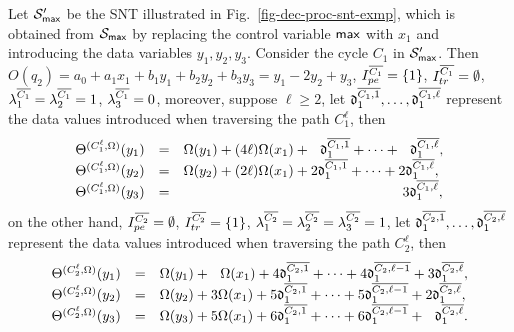 \begin{example}\label{exmp-sum}
Let ${\mathcal{S} }'_{\sf max}$ be the SNT illustrated in Fig.~\ref{fig-dec-proc-snt-exmp}, which is obtained from ${\mathcal{S} }_{\sf max}$ by replacing  the control variable $\sf max$ with  $x_1$ and introducing the data variables $y_1,y_2, y_3$. Consider the cycle $C_1$ in ${\mathcal{S} }'_{\sf max}$. Then $O(q_2)= a_0 + a_1 x_1 + b_1 y_1 + b_2 y_2 + b_3 y_3 = y_1 - 2y_2 + y_3$, $I^{\overline{C_1}}_{pe} = \{1\}$, $I^{\overline{C_1}}_{tr} = \emptyset$, $\lambda^{\overline{C_1}}_1 = \lambda^{\overline{C_1}}_2 = 1$, $\lambda^{\overline{C_1}}_3 = 0$, moreover, suppose $\ell \ge 2$, let $ \mathfrak{d}^{\overline{C_1, 1}}_1, \dots, \mathfrak{d}^{\overline{C_1, \ell}}_1$ represent the data values introduced when traversing the path $C^\ell_1$, then
\[
\begin{array}{l c l}
\sumf^{(C^\ell_1, \initval)}(y_1) &= & \initval(y_1) + (4 \ell) \initval(x_1) +\ \ \vard^{\circled{C_1, 1}}_1 + \dots +\ \ \vard^{\circled{C_1, \ell}}_1,\\
%
\sumf^{(C^\ell_1, \initval)}(y_2) &=& \initval(y_2) + (2 \ell) \initval(x_1) + 2 \vard^{\circled{C_1, 1}}_1 + \dots + 2 \vard^{\circled{C_1, \ell}}_1,\\
%
\sumf^{(C^\ell_1, \initval)}(y_3) &=& \hspace{5.5cm} 3 \vard^{\circled{C_1, \ell}}_1,
\end{array}
\] 
on the other hand, $I^{\overline{C_2}}_{pe} = \emptyset$, $I^{\overline{C_2}}_{tr} = \{1\}$, $\lambda^{\overline{C_2}}_1 = \lambda^{\overline{C_2}}_2 = \lambda^{\overline{C_2}}_3  = 1$, let $ \mathfrak{d}^{\overline{C_2, 1}}_1, \dots, \mathfrak{d}^{\overline{C_2, \ell}}_1$ represent the data values introduced when traversing the path $C^\ell_2$, then 
\[
\begin{array}{l c l}
\sumf^{(C^\ell_2, \initval)}(y_1) &= & \initval(y_1) +\ \  \initval(x_1) +4 \vard^{\circled{C_2, 1}}_1 + \dots +4 \vard^{\circled{C_2, \ell-1}}_1 + 3 \vard^{\circled{C_2, \ell}}_1,\\
%
\sumf^{(C^\ell_2, \initval)}(y_2) &=& \initval(y_2) + 3 \initval(x_1) + 5 \vard^{\circled{C_2, 1}}_1 + \dots + 5 \vard^{\circled{C_2, \ell-1}}_1 + 2 \vard^{\circled{C_2, \ell}}_1,\\
%
\sumf^{(C^\ell_2, \initval)}(y_3) &=& \initval(y_3) + 5 \initval(x_1) + 6 \vard^{\circled{C_2, 1}}_1 + \dots + 6 \vard^{\circled{C_2, \ell-1}}_1 + \ \ \vard^{\circled{C_2, \ell}}_1.
\end{array}
\] 
\begin{figure}[htbp]
\begin{center}

\end{center}
\end{figure}
\end{example}

